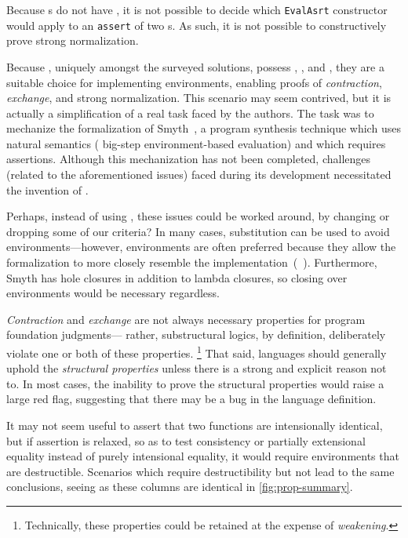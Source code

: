 Because \fpf{}s do not have \EqDec, it is not possible to decide which \texttt{EvalAsrt} constructor would
apply to an \texttt{assert} of two \fpf{}s. As such, it is not possible to constructively prove strong normalization.

Because \dds, uniquely amongst the surveyed solutions, possess \SemTot, \SemInj, and \EqDec,
they are a suitable choice for implementing environments, enabling proofs of \emph{contraction},
\emph{exchange}, and strong normalization.
This scenario may seem contrived, but it is actually a simplification of a real task faced by the authors.
The task was to mechanize the formalization of Smyth~\citep{smyth}, a program synthesis technique which uses
natural semantics (\ie{} big-step environment-based evaluation) and which requires assertions.
Although this mechanization has not been completed, challenges (related to the aforementioned issues)
faced during its development necessitated the invention of \dds.

Perhaps, instead of using \dds, these issues could be worked around, by changing or dropping some of our criteria?
In many cases, substitution can be used to avoid environments---however, environments are often preferred because
they allow the formalization to more closely resemble the implementation~(\eg{}~\citep{Ancona:2014}). Furthermore,
Smyth has hole closures in addition to lambda closures, so closing over environments would be necessary regardless.

\emph{Contraction} and \emph{exchange} are not always necessary properties for program foundation judgments---%
rather, substructural logics, by definition, deliberately violate one or both of these properties.%
\footnote{\hspace{0.01in}Technically, these properties could be retained at the expense of \emph{weakening}.}
That said, languages should generally uphold the \emph{structural properties} unless there is a strong and explicit
reason not to. In most cases, the inability to prove the structural properties would raise a large red flag,
suggesting that there may be a bug in the language definition.

It may not seem useful to assert that two functions are intensionally identical, but if assertion is relaxed,
so as to test consistency or partially extensional equality instead of purely intensional equality,
it would require environments that are destructible.
Scenarios which require destructibility but not \EqDec{} lead to the same conclusions,
seeing as these columns are identical in \autoref{fig:prop-summary}.

